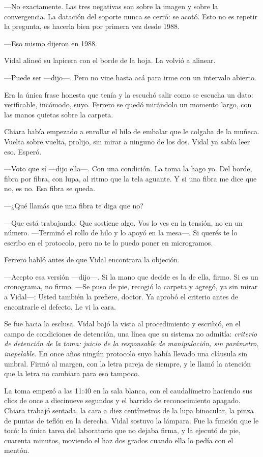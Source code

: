---No exactamente. Las tres negativas son sobre la imagen y sobre la convergencia. La datación del soporte nunca se cerró: se acotó. Esto no es repetir la pregunta, es hacerla bien por primera vez desde 1988.

---Eso mismo dijeron en 1988.

Vidal alineó su lapicera con el borde de la hoja. La volvió a alinear.

---Puede ser ---dijo---. Pero no vine hasta acá para irme con un intervalo abierto.

Era la única frase honesta que tenía y la escuchó salir como se escucha un dato: verificable, incómodo, suyo. Ferrero se quedó mirándolo un momento largo, con las manos quietas sobre la carpeta.

Chiara había empezado a enrollar el hilo de embalar que le colgaba de la muñeca. Vuelta sobre vuelta, prolijo, sin mirar a ninguno de los dos. Vidal ya sabía leer eso. Esperó.

---Voto que sí ---dijo ella---. Con una condición. La toma la hago yo. Del borde, fibra por fibra, con lupa, al ritmo que la tela aguante. Y si una fibra me dice que no, es no. Esa fibra se queda.

---¿Qué llamás que una fibra te diga que no?

---Que está trabajando. Que sostiene algo. Vos lo ves en la tensión, no en un número. ---Terminó el rollo de hilo y lo apoyó en la mesa---. Si querés te lo escribo en el protocolo, pero no te lo puedo poner en microgramos.

Ferrero habló antes de que Vidal encontrara la objeción.

---Acepto esa versión ---dijo---. Si la mano que decide es la de ella, firmo. Si es un cronograma, no firmo. ---Se puso de pie, recogió la carpeta y agregó, ya sin mirar a Vidal---: Usted también la prefiere, doctor. Ya aprobó el criterio antes de encontrarle el defecto. Le vi la cara.

Se fue hacia la esclusa. Vidal bajó la vista al procedimiento y escribió, en el campo de condiciones de detención, una línea que su sistema no admitía: \textit{criterio de detención de la toma: juicio de la responsable de manipulación, sin parámetro, inapelable.} En once años ningún protocolo suyo había llevado una cláusula sin umbral. Firmó al margen, con la letra pareja de siempre, y le llamó la atención que la letra no cambiara para eso tampoco.

La toma empezó a las 11:40 en la sala blanca, con el caudalímetro haciendo sus clics de once a diecinueve segundos y el barrido de reconocimiento apagado. Chiara trabajó sentada, la cara a diez centímetros de la lupa binocular, la pinza de puntas de teflón en la derecha. Vidal sostuvo la lámpara. Fue la función que le tocó: la única tarea del laboratorio que no dejaba firma, y la ejecutó de pie, cuarenta minutos, moviendo el haz dos grados cuando ella lo pedía con el mentón.

